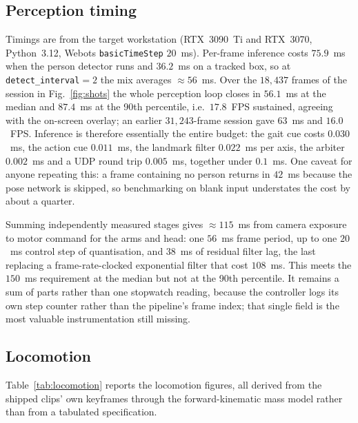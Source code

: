 \documentclass[twocolumn]{article}
\begin{document}
\subsection{Perception timing}

Timings are from the target workstation (RTX~3090~Ti and RTX~3070, Python~3.12, Webots
\texttt{basicTimeStep} $20$~ms). Per-frame inference costs $75.9$~ms when the person detector
runs and $36.2$~ms on a tracked box, so at \texttt{detect\_interval}${}=2$ the mix averages
$\approx 56$~ms. Over the $18{,}437$ frames of the session in Fig.~\ref{fig:shots} the whole
perception loop closes in $56.1$~ms at the median and $87.4$~ms at the 90th percentile, i.e.\
$17.8$~FPS sustained, agreeing with the on-screen overlay; an earlier $31{,}243$-frame session
gave $63$~ms and $16.0$~FPS. Inference is therefore essentially the entire budget:
the gait cue costs $0.030$~ms, the action cue $0.011$~ms, the landmark filter $0.022$~ms per
axis, the arbiter $0.002$~ms and a UDP round trip $0.005$~ms, together under $0.1$~ms. One
caveat for anyone repeating this: a frame containing no person returns in $42$~ms because the
pose network is skipped, so benchmarking on blank input understates the cost by about a
quarter.

Summing independently measured stages gives $\approx 115$~ms from camera exposure to motor
command for the arms and head: one $56$~ms frame period, up to one $20$~ms control step of
quantisation, and $38$~ms of residual filter lag, the last replacing a frame-rate-clocked
exponential filter that cost $108$~ms. This meets the $150$~ms requirement at the median but
not at the 90th percentile. It remains a sum of parts rather than one stopwatch reading,
because the controller logs its own step counter rather than the pipeline's frame index; that
single field is the most valuable instrumentation still missing.

\subsection{Locomotion}

Table~\ref{tab:locomotion} reports the locomotion figures, all derived from the shipped clips'
own keyframes through the forward-kinematic mass model rather than from a tabulated
specification.
\end{document}

